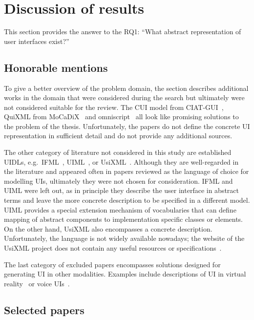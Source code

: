 \section{Discussion of results}\label{sec:review-discussion-of-results}

This section provides the answer to the RQ1: \enquote{What abstract representation of user interfaces exist?}

\subsection{Honorable mentions}\label{subsec:honorable-mentions}
To give a better overview of the problem domain, the section describes additional works in the domain that were considered during the search but ultimately were not considered suitable for the review.
The CUI model from CIAT-GUI~\cite{Molina2012-my}, QuiXML from MoCaDiX~\cite{Vanderdonckt2019-av} and omniscript~\cite{Ulusoy2019-jh} all look like promising solutions to the problem of the thesis.
Unfortunately, the papers do not define the concrete UI representation in sufficient detail and do not provide any additional sources.

The other category of literature not considered in this study are established UIDLs, e.g.\ IFML~\cite{Brambilla2014-ln}, UIML~\cite{Abrams1999}, or UsiXML~\cite{Limbourg2005}.
Although they are well-regarded in the literature and appeared often in papers reviewed as the language of choice for modelling UIs, ultimately they were not chosen for consideration.
IFML and UIML were left out, as in principle they describe the user interface in abstract terms and leave the more concrete description to be specified in a different model.
UIML provides a special extension mechanism of vocabularies that can define mapping of abstract components to implementation specific classes or elements.
On the other hand, UsiXML also encompasses a concrete description.
Unfortunately, the language is not widely available nowadays;
the website of the UsiXML project does not contain any useful resources or specifications~.

The last category of excluded papers encompasses solutions designed for generating UI in other modalities.
Examples include descriptions of UI in virtual reality~\cite{Olmedo2015} or voice UIs~\cite{steinberger2020domain}.

\subsection{Selected papers}\label{subsec:selected-papers}

